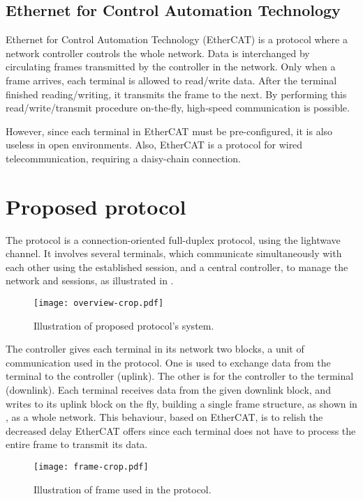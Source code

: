 ﻿\documentclass[twocolumn,9pt]{ltjsarticle}
\renewcommand{\ref}{\Cref}
\begin{document}
\subsection{Ethernet for Control Automation Technology}
Ethernet for Control Automation Technology (EtherCAT) is a protocol where a network controller controls the whole network.
Data is interchanged by circulating frames transmitted by the controller in the network.
Only when a frame arrives, each terminal is allowed to read/write data.
After the terminal finished reading/writing, it transmits the frame to the next.
By performing this read/write/transmit procedure on-the-fly, high-speed communication is possible.

However, since each terminal in EtherCAT must be pre-configured, it is also useless in open environments.
Also, EtherCAT is a protocol for wired telecommunication, requiring a daisy-chain connection.

\section{Proposed protocol}
The protocol is a connection-oriented full-duplex protocol, using the lightwave channel.
It involves several terminals, which communicate simultaneously with each other using the established session, and a central controller, to manage the network and sessions, as illustrated in \ref{fig:overview}.

\begin{figure}[tb]
  \centering
  \texttt{[image: overview-crop.pdf]}
  \caption{\label{fig:overview}
    Illustration of proposed protocol's system.
  }
\end{figure}

The controller gives each terminal in its network two blocks, a unit of communication used in the protocol.
One is used to exchange data from the terminal to the controller (uplink).
The other is for the controller to the terminal (downlink).
Each terminal receives data from the given downlink block, and writes to its uplink block on the fly, building a single frame structure, as shown in \ref{fig:frame}, as a whole network.
This behaviour, based on EtherCAT, is to relish the decreased delay EtherCAT offers since each terminal does not have to process the entire frame to transmit its data.
\begin{figure}[tb]
  \centering
  \texttt{[image: frame-crop.pdf]}
  \caption{\label{fig:frame}
    Illustration of frame used in the protocol.
  }
\end{figure}
\end{document}
